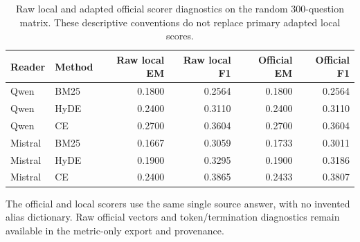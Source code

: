\begin{table}[htbp]
\centering\footnotesize
\setlength{\tabcolsep}{3pt}
\renewcommand{\arraystretch}{1.08}
\caption{Raw local and adapted official scorer diagnostics on the random 300-question matrix. These descriptive conventions do not replace primary adapted local scores.}
\label{tab:followup_holdout_score_sensitivity}
\begin{tabularx}{\textwidth}{l l r r r r}
\toprule
Reader & Method & Raw local EM & Raw local F1 & Official EM & Official F1 \\
\midrule
Qwen & BM25 & 0.1800 & 0.2564 & 0.1800 & 0.2564 \\
Qwen & HyDE & 0.2400 & 0.3110 & 0.2400 & 0.3110 \\
Qwen & CE & 0.2700 & 0.3604 & 0.2700 & 0.3604 \\
Mistral & BM25 & 0.1667 & 0.3059 & 0.1733 & 0.3011 \\
Mistral & HyDE & 0.1900 & 0.3295 & 0.1900 & 0.3186 \\
Mistral & CE & 0.2400 & 0.3865 & 0.2433 & 0.3807 \\
\bottomrule
\end{tabularx}
\begin{tablenotes}\footnotesize
\item The official and local scorers use the same single source answer, with no invented alias dictionary. Raw official vectors and token/termination diagnostics remain available in the metric-only export and provenance.
\end{tablenotes}
\end{table}
